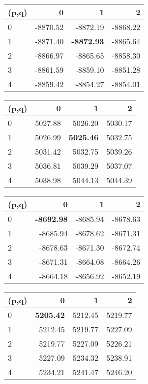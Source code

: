 \begin{adjustbox}{width=.95\textwidth,center}
\begin{tabular}{lrrr}
\toprule
(p,q)   &          0     &       1       &     2 \\
\midrule
0 & -8870.52 & -8872.19 & -8868.22 \\
1 & -8871.40 & \textbf{-8872.93} & -8865.64 \\
2 & -8866.97 & -8865.65 & -8858.30 \\
3 & -8861.59 & -8859.10 & -8851.28 \\
4 & -8859.42 & -8854.27 & -8854.01 \\ 
\bottomrule
\end{tabular}
\quad
\begin{tabular}{lrrr}
\toprule
(p,q)   &          0     &       1       &     2 \\
\midrule
0 & 5027.88  & 5026.20  & 5030.17 \\
1 & 5026.99  & \textbf{5025.46}  & 5032.75 \\
2  & 5031.42  & 5032.75  & 5039.26 \\
3  & 5036.81  & 5039.29  & 5037.07 \\
4  & 5038.98  & 5044.13  & 5044.39 \\
\bottomrule
\end{tabular}
\end{adjustbox}

\hspace{6ex}
\newline
\hspace{6ex}
\newline
{}
\begin{adjustbox}{width=.95\textwidth,center}
\begin{tabular}{lrrr}
\toprule
(p,q)   &          0     &       1       &     2 \\
\midrule
0 & \textbf{-8692.98} & -8685.94 & -8678.63 \\
1 & -8685.94 & -8678.62 & -8671.31 \\
2 & -8678.63 & -8671.30 & -8672.74 \\
3 & -8671.31 & -8664.08 & -8664.26 \\
4 & -8664.18 & -8656.92 & -8652.19 \\
\bottomrule
\end{tabular}
\quad
\begin{tabular}{lrrr}
\toprule
(p,q)   &          0     &       1       &     2 \\
\midrule
0 & \textbf{5205.42} & 5212.45 & 5219.77 \\
1 & 5212.45 & 5219.77 & 5227.09 \\
2 & 5219.77 & 5227.09 & 5226.21 \\
3 & 5227.09 & 5234.32 & 5238.91 \\
4 & 5234.21 & 5241.47 & 5246.20 \\
\bottomrule
\end{tabular}
\end{adjustbox}